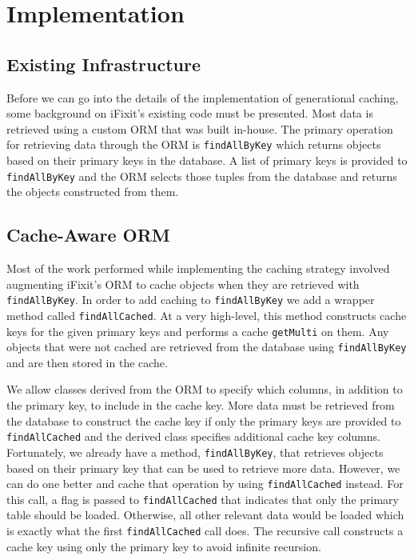 \documentclass[12pt]{ucthesis}
\begin{document}
\section{Implementation}
\subsection{Existing Infrastructure}
Before we can go into the details of the implementation of generational caching, some background on \textsf{iFixit}'s existing code must be presented.
Most data is retrieved using a custom ORM that was built in-house.
The primary operation for retrieving data through the ORM is {\tt findAllByKey} which returns objects based on their primary keys in the database.
A list of primary keys is provided to {\tt findAllByKey} and the ORM selects those tuples from the database and returns the objects constructed from them.

\subsection{Cache-Aware ORM}
Most of the work performed while implementing the caching strategy involved augmenting \textsf{iFixit}'s ORM to cache objects when they are retrieved with {\tt findAllByKey}.
In order to add caching to {\tt findAllByKey} we add a wrapper method called {\tt findAllCached}.
At a very high-level, this method constructs cache keys for the given primary keys and performs a cache {\tt getMulti} on them.
Any objects that were not cached are retrieved from the database using {\tt findAllByKey} and are then stored in the cache.

We allow classes derived from the ORM to specify which columns, in addition to the primary key, to include in the cache key.
More data must be retrieved from the database to construct the cache key if only the primary keys are provided to {\tt findAllCached} and the derived class specifies additional cache key columns.
Fortunately, we already have a method, {\tt findAllByKey}, that retrieves objects based on their primary key that can be used to retrieve more data.
However, we can do one better and cache that operation by using {\tt findAllCached} instead.
For this call, a flag is passed to {\tt findAllCached} that indicates that only the primary table should be loaded.
Otherwise, all other relevant data would be loaded which is exactly what the first {\tt findAllCached} call does.
The recursive call constructs a cache key using only the primary key to avoid infinite recursion.
\end{document}
